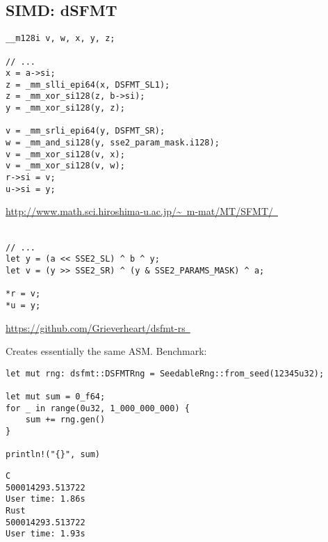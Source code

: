 \documentclass[14pt]{beamer}
\newcommand{\exturl}[1]{\exthref{#1}{#1}}
\newcommand{\exthref}[2]{\href{#1}{#2\ \footnotesize\faExternalLink}}
\begin{document}
\subsection{SIMD: dSFMT}
\begin{frame}[fragile]
  \fontsize{8pt}{8pt}\selectfont
  \begin{verbatim}
__m128i v, w, x, y, z;

// ...
x = a->si;
z = _mm_slli_epi64(x, DSFMT_SL1);
z = _mm_xor_si128(z, b->si);
y = _mm_xor_si128(y, z);

v = _mm_srli_epi64(y, DSFMT_SR);
w = _mm_and_si128(y, sse2_param_mask.i128);
v = _mm_xor_si128(v, x);
v = _mm_xor_si128(v, w);
r->si = v;
u->si = y;
  \end{verbatim}

  \begin{flushright}
    \exthref{http://www.math.sci.hiroshima-u.ac.jp/~\%20m-mat/MT/SFMT/}{http://www.math.sci.hiroshima-u.ac.jp/\textasciitilde\ m-mat/MT/SFMT/}\\~\\
  \end{flushright}

\pause
  \begin{verbatim}
// ...
let y = (a << SSE2_SL) ^ b ^ y;
let v = (y >> SSE2_SR) ^ (y & SSE2_PARAMS_MASK) ^ a;

*r = v;
*u = y;
  \end{verbatim}

  \begin{flushright}
    \exturl{https://github.com/Grieverheart/dsfmt-rs}
  \end{flushright}

\end{frame}

\begin{frame}[fragile]
  Creates essentially the same ASM. Benchmark:

\fontsize{9pt}{9pt}\selectfont
  \begin{verbatim}
let mut rng: dsfmt::DSFMTRng = SeedableRng::from_seed(12345u32);

let mut sum = 0_f64;
for _ in range(0u32, 1_000_000_000) {
    sum += rng.gen()
}

println!("{}", sum)
  \end{verbatim}

\fontsize{14pt}{14pt}\selectfont
\begin{verbatim}
C
500014293.513722
User time: 1.86s
Rust
500014293.513722
User time: 1.93s
\end{verbatim}
\end{frame}
\end{document}
